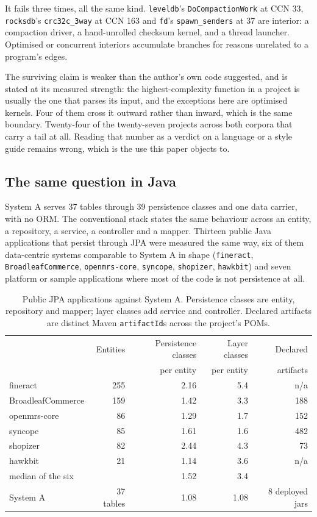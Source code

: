 \documentclass[11pt,a4paper]{article}
\begin{document}
It fails three times, all the same kind. \texttt{leveldb}'s \texttt{DoCompactionWork} at CCN 33, \texttt{rocksdb}'s \texttt{crc32c\_3way} at CCN 163 and \texttt{fd}'s \texttt{spawn\_senders} at 37 are interior: a compaction driver, a hand-unrolled checksum kernel, and a thread launcher. Optimised or concurrent interiors accumulate branches for reasons unrelated to a program's edges.

The surviving claim is weaker than the author's own code suggested, and is stated at its measured strength: the highest-complexity function in a project is usually the one that parses its input, and the exceptions here are optimised kernels. Four of them cross it outward rather than inward, which is the same boundary. Twenty-four of the twenty-seven projects across both corpora that carry a tail at all. Reading that number as a verdict on a language or a style guide remains wrong, which is the use this paper objects to.

\subsection{The same question in Java}
\label{sec:jpa}

System A serves 37 tables through 39 persistence classes and one data carrier, with no ORM. The conventional stack states the same behaviour across an entity, a repository, a service, a controller and a mapper. Thirteen public Java applications that persist through JPA were measured the same way, six of them data-centric systems comparable to System A in shape (\texttt{fineract}, \texttt{BroadleafCommerce}, \texttt{openmrs-core}, \texttt{syncope}, \texttt{shopizer}, \texttt{hawkbit}) and seven platform or sample applications where most of the code is not persistence at all.

\begin{table}[H]
\centering
\small
\begin{tabular}{lrrrr}
\toprule
& Entities & Persistence classes & Layer classes & Declared \\
& & per entity & per entity & artifacts \\
\midrule
fineract & 255 & 2.16 & 5.4 & n/a \\
BroadleafCommerce & 159 & 1.42 & 3.3 & 188 \\
openmrs-core & 86 & 1.29 & 1.7 & 152 \\
syncope & 85 & 1.61 & 1.6 & 482 \\
shopizer & 82 & 2.44 & 4.3 & 73 \\
hawkbit & 21 & 1.14 & 3.6 & n/a \\
\midrule
median of the six & & 1.52 & 3.4 & \\
\addlinespace
System A & 37 tables & 1.08 & 1.08 & 8 deployed jars \\
\bottomrule
\end{tabular}
\caption{Public JPA applications against System A. Persistence classes are entity, repository and mapper; layer classes add service and controller. Declared artifacts are distinct Maven \texttt{artifactId}s across the project's POMs.}
\label{tab:jpa}
\end{table}
\end{document}
